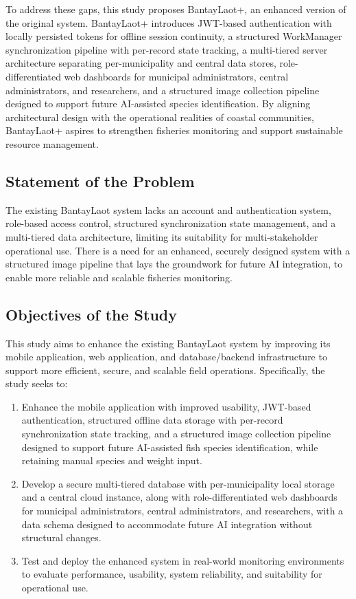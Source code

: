 \documentclass[journal]{IEEEtran}
\begin{document}
To address these gaps, this study proposes BantayLaot+, an enhanced version of the original system. BantayLaot+ introduces JWT-based authentication with locally persisted tokens for offline session continuity, a structured WorkManager synchronization pipeline with per-record state tracking, a multi-tiered server architecture separating per-municipality and central data stores, role-differentiated web dashboards for municipal administrators, central administrators, and researchers, and a structured image collection pipeline designed to support future AI-assisted species identification. By aligning architectural design with the operational realities of coastal communities, BantayLaot+ aspires to strengthen fisheries monitoring and support sustainable resource management.

\subsection{Statement of the Problem}

The existing BantayLaot system lacks an account and authentication system, role-based access control, structured synchronization state management, and a multi-tiered data architecture, limiting its suitability for multi-stakeholder operational use. There is a need for an enhanced, securely designed system with a structured image pipeline that lays the groundwork for future AI integration, to enable more reliable and scalable fisheries monitoring.

\subsection{Objectives of the Study}

This study aims to enhance the existing BantayLaot system by improving its mobile application, web application, and database/backend infrastructure to support more efficient, secure, and scalable field operations. Specifically, the study seeks to:

\begin{enumerate}
\item Enhance the mobile application with improved usability, JWT-based authentication, structured offline data storage with per-record synchronization state tracking, and a structured image collection pipeline designed to support future AI-assisted fish species identification, while retaining manual species and weight input.
\item Develop a secure multi-tiered database with per-municipality local storage and a central cloud instance, along with role-differentiated web dashboards for municipal administrators, central administrators, and researchers, with a data schema designed to accommodate future AI integration without structural changes.
\item Test and deploy the enhanced system in real-world monitoring environments to evaluate performance, usability, system reliability, and suitability for operational use.
\end{enumerate}
\end{document}
